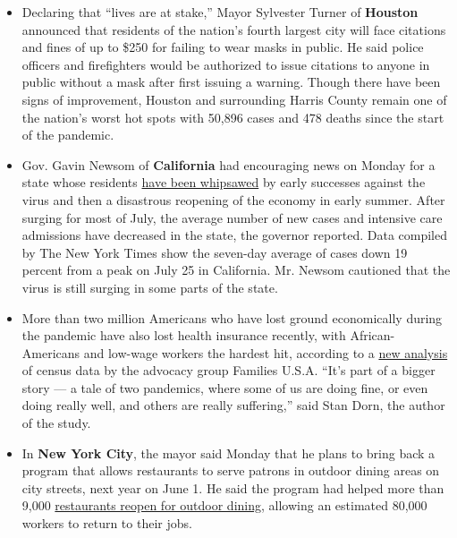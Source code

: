 \begin{itemize}
\item
  Declaring that ``lives are at stake,'' Mayor Sylvester Turner of
  \textbf{Houston} announced that residents of the nation's fourth
  largest city will face citations and fines of up to \$250 for failing
  to wear masks in public. He said police officers and firefighters
  would be authorized to issue citations to anyone in public without a
  mask after first issuing a warning. Though there have been signs of
  improvement, Houston and surrounding Harris County remain one of the
  nation's worst hot spots with 50,896 cases and 478 deaths since the
  start of the pandemic.
\item
  Gov. Gavin Newsom of \textbf{California} had encouraging news on
  Monday for a state whose residents
  \href{https://slack-redir.net/link?url=https\%3A\%2F\%2Fwww.nytimes.com\%2F2020\%2F07\%2F23\%2Fus\%2Fcalifornia-covid-19-cases.html}{have
  been whipsawed} by early successes against the virus and then a
  disastrous reopening of the economy in early summer. After surging for
  most of July, the average number of new cases and intensive care
  admissions have decreased in the state, the governor reported. Data
  compiled by The New York Times show the seven-day average of cases
  down 19 percent from a peak on July 25 in California. Mr. Newsom
  cautioned that the virus is still surging in some parts of the state.
\end{itemize}

\begin{itemize}
\item
  More than two million Americans who have lost ground economically
  during the pandemic have also lost health insurance recently, with
  African-Americans and low-wage workers the hardest hit, according to a
  \href{https://familiesusa.org/resources/americas-coverage-crisis-deepens-new-survey-data-show-millions-of-adults-became-uninsured-starting-in-late-june/}{new
  analysis} of census data by the advocacy group Families U.S.A. ``It's
  part of a bigger story --- a tale of two pandemics, where some of us
  are doing fine, or even doing really well, and others are really
  suffering,'' said Stan Dorn, the author of the study.
\item
  In \textbf{New York City}, the mayor said Monday that he plans to
  bring back a program that allows restaurants to serve patrons in
  outdoor dining areas on city streets, next year on June 1. He said the
  program had helped more than 9,000
  \href{https://www.nytimes.com/2020/08/03/nyregion/nyc-small-businesses-closing-coronavirus.html}{restaurants
  reopen for outdoor dining}, allowing an estimated 80,000 workers to
  return to their jobs.
\end{itemize}

